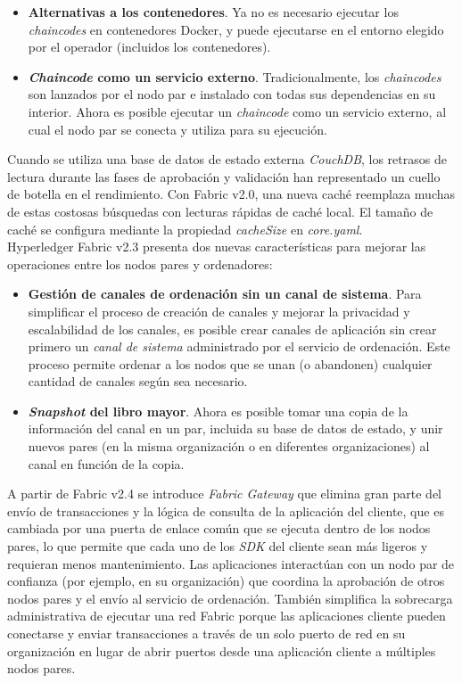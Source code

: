 {\begin{itemize}
\item {\bf Alternativas a los contenedores}. Ya no es necesario ejecutar los \emph{chaincodes} en contenedores Docker, y puede ejecutarse en el entorno elegido por el operador (incluidos los contenedores).


\item {\bf \emph{Chaincode} como un servicio externo}. Tradicionalmente, los \emph{chaincodes} son lanzados por el nodo par e instalado con todas sus dependencias en su interior. Ahora es posible ejecutar un \emph{chaincode} como un servicio externo, al cual el nodo par se conecta y utiliza para su ejecuci\'on.
\end{itemize}

Cuando se utiliza una base de datos de estado externa \emph{CouchDB}, los retrasos de lectura durante las fases de aprobaci\'on y validaci\'on han representado un cuello de botella en el rendimiento. Con Fabric v2.0, una nueva cach\'e reemplaza muchas de estas costosas b\'usquedas con lecturas r\'apidas de cach\'e local. El tama\~no de cach\'e se configura mediante la propiedad \emph{cacheSize} en \emph{core.yaml}.\\

Hyperledger Fabric v2.3 presenta dos nuevas caracter\'isticas para mejorar las operaciones entre los nodos pares y ordenadores:

\begin{itemize}
\item {\bf Gesti\'on de canales de ordenaci\'on sin un canal de sistema}. Para simplificar el proceso de creaci\'on de canales y mejorar la privacidad y escalabilidad de los canales, es posible crear canales de aplicaci\'on sin crear primero un \emph{canal de sistema} administrado por el servicio de ordenaci\'on. Este proceso permite ordenar a los nodos que se unan (o abandonen) cualquier cantidad de canales seg\'un sea necesario.

\item {\bf \emph{Snapshot} del libro mayor}. Ahora es posible tomar una copia de la informaci\'on del canal en un par, incluida su base de datos de estado, y unir nuevos pares (en la misma organizaci\'on o en diferentes organizaciones) al canal en funci\'on de la copia.
\end{itemize}

A partir de Fabric v2.4 se introduce \emph{Fabric Gateway} que elimina gran parte del env\'io de transacciones y la l\'ogica de consulta de la aplicaci\'on del cliente, que es cambiada por una puerta de enlace com\'un que se ejecuta dentro de los nodos pares, lo que permite que cada uno de los \emph{SDK} del cliente sean m\'as ligeros y requieran menos mantenimiento. Las aplicaciones interact\'uan con un nodo par de confianza (por ejemplo, en su organizaci\'on) que coordina la aprobaci\'on de otros nodos pares y el env\'io al servicio de ordenaci\'on. Tambi\'en simplifica la sobrecarga administrativa de ejecutar una red Fabric porque las aplicaciones cliente pueden conectarse y enviar transacciones a trav\'es de un solo puerto de red en su organizaci\'on en lugar de abrir puertos desde una aplicaci\'on cliente a m\'ultiples nodos pares.\\

}
